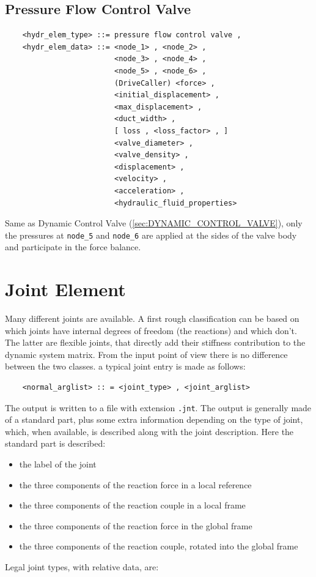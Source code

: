\subsection{Pressure Flow Control Valve}
\begin{verbatim}
    <hydr_elem_type> ::= pressure flow control valve ,
    <hydr_elem_data> ::= <node_1> , <node_2> ,
                         <node_3> , <node_4> ,
                         <node_5> , <node_6> ,
                         (DriveCaller) <force> ,
                         <initial_displacement> ,
                         <max_displacement> ,
                         <duct_width> ,
                         [ loss , <loss_factor> , ]
                         <valve_diameter> ,
                         <valve_density> ,
                         <displacement> ,
                         <velocity> ,
                         <acceleration> ,
                         <hydraulic_fluid_properties>
\end{verbatim}
Same as Dynamic Control Valve (\ref{sec:DYNAMIC_CONTROL_VALVE}),
only the pressures at \texttt{node\_5} and \texttt{node\_6} are applied
at the sides of the valve body and participate in the force balance.



\section{Joint Element}
Many different joints are available. A first rough classification can be
based on which joints have internal degrees of freedom (the reactions) and
which don't. The latter are flexible joints, that directly add their
stiffness contribution to the dynamic system matrix. From the input point
of view there is no difference between the two classes.
a typical joint entry is made as follows:
\begin{verbatim}
    <normal_arglist> :: = <joint_type> , <joint_arglist>
\end{verbatim}
The output is written to a file with extension \texttt{.jnt}.
The output is generally made of a standard part, plus some extra information
depending on the type of joint, which, when available, is described along
with the joint description.
Here the standard part is described:
\begin{itemize}
    \item the label of the joint
    \item the three components of the reaction force in a local reference
    \item the three components of the reaction couple in a local frame
    \item the three components of the reaction force in the global frame
    \item the three components of the reaction couple, rotated into the
          global frame
\end{itemize}
Legal joint types, with relative data, are:


